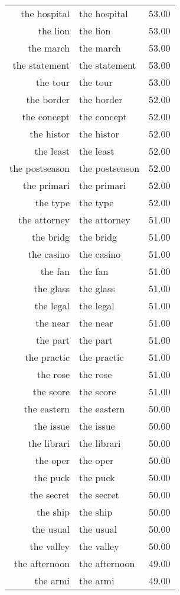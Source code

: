 \begin{table}[ht]
\begin{tabular}{rlr}
  the hospital & the hospital & 53.00 \\ 
  the lion & the lion & 53.00 \\ 
  the march & the march & 53.00 \\ 
  the statement & the statement & 53.00 \\ 
  the tour & the tour & 53.00 \\ 
  the border & the border & 52.00 \\ 
  the concept & the concept & 52.00 \\ 
  the histor & the histor & 52.00 \\ 
  the least & the least & 52.00 \\ 
  the postseason & the postseason & 52.00 \\ 
  the primari & the primari & 52.00 \\ 
  the type & the type & 52.00 \\ 
  the attorney & the attorney & 51.00 \\ 
  the bridg & the bridg & 51.00 \\ 
  the casino & the casino & 51.00 \\ 
  the fan & the fan & 51.00 \\ 
  the glass & the glass & 51.00 \\ 
  the legal & the legal & 51.00 \\ 
  the near & the near & 51.00 \\ 
  the part & the part & 51.00 \\ 
  the practic & the practic & 51.00 \\ 
  the rose & the rose & 51.00 \\ 
  the score & the score & 51.00 \\ 
  the eastern & the eastern & 50.00 \\ 
  the issue & the issue & 50.00 \\ 
  the librari & the librari & 50.00 \\ 
  the oper & the oper & 50.00 \\ 
  the puck & the puck & 50.00 \\ 
  the secret & the secret & 50.00 \\ 
  the ship & the ship & 50.00 \\ 
  the usual & the usual & 50.00 \\ 
  the valley & the valley & 50.00 \\ 
  the afternoon & the afternoon & 49.00 \\ 
  the armi & the armi & 49.00 \\ 

\end{tabular}
\end{table}
